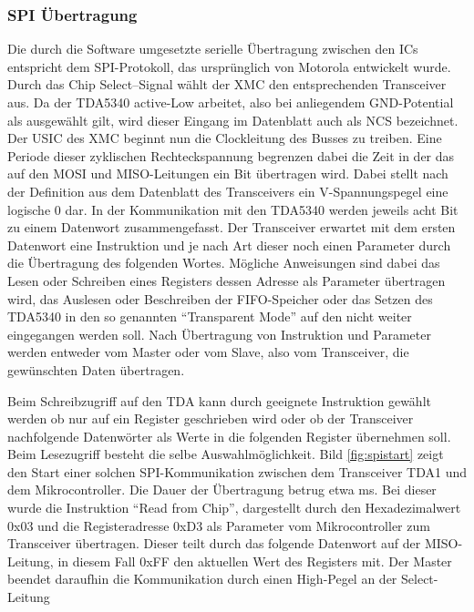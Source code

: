 \subsubsection*{SPI Übertragung}
Die durch die Software umgesetzte serielle Übertragung zwischen den \acp{IC} entspricht dem \ac{SPI}-Protokoll, das ursprünglich von Motorola entwickelt wurde\cite{BuchSPI}. Durch das Chip Select–Signal wählt der XMC den entsprechenden Transceiver aus. Da der TDA5340 active-Low arbeitet, also bei anliegendem \ac{GND}-Potential als ausgewählt gilt, wird dieser Eingang im Datenblatt auch als \acf{NCS} bezeichnet. 
Der \ac{USIC} des XMC beginnt nun die Clockleitung des Busses zu treiben. Eine Periode dieser zyklischen Rechteckspannung begrenzen dabei die Zeit in der das auf den \ac{MOSI} und \ac{MISO}-Leitungen ein Bit übertragen wird. Dabei stellt nach der Definition aus dem Datenblatt des Transceivers ein \unit[0]{V}-Spannungspegel eine logische $0$ dar. In der Kommunikation mit den TDA5340 werden jeweils acht Bit zu einem Datenwort zusammengefasst. Der Transceiver erwartet mit dem ersten Datenwort eine Instruktion und je nach Art dieser noch einen Parameter durch die Übertragung des folgenden Wortes. Mögliche Anweisungen sind dabei das Lesen oder Schreiben eines Registers dessen Adresse als Parameter übertragen wird, das Auslesen oder Beschreiben der \ac{FIFO}-Speicher oder das Setzen des TDA5340 in den so genannten \enquote{Transparent Mode} auf den nicht weiter eingegangen werden soll. Nach Übertragung von Instruktion und Parameter werden entweder vom Master oder vom Slave, also vom Transceiver, die gewünschten Daten übertragen.

Beim Schreibzugriff auf den TDA kann durch geeignete Instruktion gewählt werden ob nur auf ein Register geschrieben wird oder ob der Transceiver nachfolgende Datenwörter als Werte in die folgenden Register übernehmen soll. 
Beim Lesezugriff besteht die selbe Auswahlmöglichkeit. Bild \ref{fig:spistart} zeigt den Start einer solchen \ac{SPI}-Kommunikation zwischen dem Transceiver TDA1 und dem Mikrocontroller. Die Dauer der Übertragung betrug etwa \unit[0,26]{ms}. Bei dieser wurde die Instruktion \enquote{Read from Chip}, dargestellt durch den Hexadezimalwert 0x03 und die Registeradresse 0xD3 als Parameter vom Mikrocontroller zum Transceiver übertragen. Dieser teilt durch das folgende Datenwort auf der \ac{MISO}-Leitung, in diesem Fall 0xFF den aktuellen Wert des Registers mit. Der Master beendet daraufhin die Kommunikation durch einen High-Pegel an der Select-Leitung


